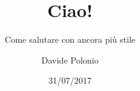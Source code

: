 \documentclass{beamer}
\title{Ciao!} %
\subtitle{Come salutare con ancora più stile}
\date{31/07/2017} %
\author{Davide Polonio} %
\institute{Università degli studi di Padova}
\begin{document}
 \begin{frame} %
  \maketitle %
 \end{frame}
\end{document}
